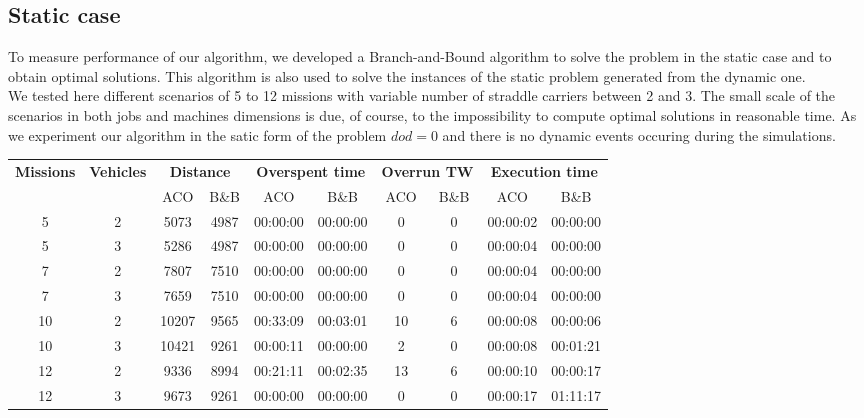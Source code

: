 \documentclass[a4paper,12pt]{article}
\begin{document}
	\subsection{Static case}
  To measure performance of our algorithm, we developed a Branch-and-Bound algorithm to solve the problem in the static case and to obtain optimal solutions. This algorithm is also used to solve the instances of the static problem generated from the dynamic one.\\

  We tested here different scenarios of 5 to 12 missions with variable number of straddle carriers between 2 and 3. The small scale of the scenarios in both jobs and machines dimensions is due, of course, to the impossibility to compute optimal solutions in reasonable time.
  As we experiment our algorithm in the satic form of the problem $dod=0$ and there is no dynamic events occuring during the simulations.

  \small
  \begin{center}
    \begin{tabular}{|c|c|c|c|c|c|c|c|c|c|} 
    \hline
      \multirow{2}{*}{\bf{Missions}} & \multirow{2}{*}{\bf{Vehicles}} & \multicolumn{2}{|c|}{\bf{Distance}} & \multicolumn{2}{|c|}{\bf{Overspent time}} & \multicolumn{2}{|c|}{\bf{Overrun TW}} &  \multicolumn{2}{|c|}{\bf{Execution time}} \\\cline{3-10}
		 &	& ACO 	& B\&B	& ACO	& B\&B		& ACO		& B\&B	& ACO		& B\&B\\ \hline
	5	 & 2 	& 5073	& 4987	& 00:00:00	& 00:00:00 	& 0	& 0	& 00:00:02	& 00:00:00\\
	5	 & 3 	& 5286	& 4987	& 00:00:00	& 00:00:00	& 0	& 0	& 00:00:04	& 00:00:00\\
	7	 & 2	& 7807	& 7510	& 00:00:00	& 00:00:00	& 0	& 0	& 00:00:04	& 00:00:00\\
	7	 & 3	& 7659	& 7510	& 00:00:00	& 00:00:00	& 0	& 0	& 00:00:04	& 00:00:00\\
	10	 & 2	& 10207	& 9565	& 00:33:09	& 00:03:01	& 10	& 6	& 00:00:08	& 00:00:06\\
	10	 & 3	& 10421	& 9261	& 00:00:11	& 00:00:00	& 2	& 0	& 00:00:08	& 00:01:21\\
	12	 & 2	& 9336	& 8994	& 00:21:11	& 00:02:35	& 13	& 6	& 00:00:10	& 00:00:17\\
	12	 & 3	& 9673	& 9261	& 00:00:00	& 00:00:00	& 0	& 0	& 00:00:17	& 01:11:17\\
      \hline
    \end{tabular}
  \end{center}
  \normalsize
\end{document}
